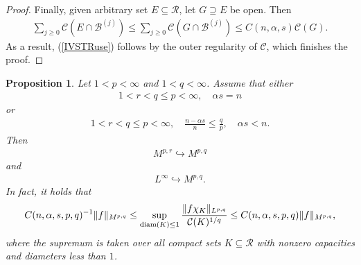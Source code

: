 \documentclass[10pt,reqno]{amsart}
\newtheorem{proposition}[theorem]{Proposition}
\numberwithin{equation}{section}
\begin{document}
\begin{proof}
Finally, given arbitrary set $E\subseteq\mathcal{R}$, let $G\supseteq E$ be open. Then
\begin{align*}
\sum_{j\geq 0}\mathcal{C}(E\cap\mathcal{B}^{(j)})\leq\sum_{j\geq 0}\mathcal{C}(G\cap\mathcal{B}^{(j)})\leq C(n,\alpha,s)\mathcal{C}(G).
\end{align*} 
As a result, (\ref{IVSTRuse}) follows by the outer regularity of $\mathcal{C}$, which finishes the proof.
\end{proof}

\begin{proposition}\label{addition}
Let $1<p<\infty$ and $1<q<\infty$. Assume that either
\begin{align*}
1<r<q\leq p<\infty,\quad \alpha s=n
\end{align*}
or
\begin{align*}
1<r<q\leq p<\infty,\quad\frac{n-\alpha s}{n}\leq\frac{q}{p},\quad\alpha s<n.
\end{align*}
Then 
\begin{align*}
M^{p,r}\hookrightarrow M^{p,q}
\end{align*}
and
\begin{align*}
L^{\infty}\hookrightarrow M^{p,q}.
\end{align*}
In fact, it holds that 
\begin{align*}
C(n,\alpha,s,p,q)^{-1}\|f\|_{M^{p,q}}\leq\sup_{{\rm diam}(K)\leq 1}\frac{\|f\chi_{K}\|_{L^{p,q}}}{\mathcal{C}(K)^{1/q}}\leq C(n,\alpha,s,p,q)\|f\|_{M^{p,q}},
\end{align*}
where the supremum is taken over all compact sets $K\subseteq\mathcal{R}$ with nonzero capacities and diameters less than $1$.
\end{proposition}
\end{document}
